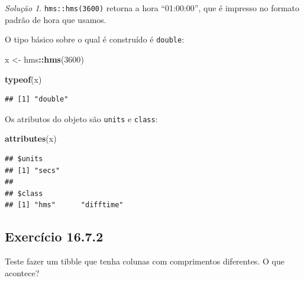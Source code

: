 \documentclass[
]{latex/krantz}
\newenvironment{Shaded}{\begin{snugshade}}{\end{snugshade}}
\newcommand{\DecValTok}[1]{\textcolor[rgb]{0.00,0.00,0.81}{#1}}
\newcommand{\FunctionTok}[1]{\textcolor[rgb]{0.13,0.29,0.53}{\textbf{#1}}}
\newcommand{\NormalTok}[1]{#1}
\newcommand{\OtherTok}[1]{\textcolor[rgb]{0.56,0.35,0.01}{#1}}
\newcommand{\SpecialCharTok}[1]{\textcolor[rgb]{0.81,0.36,0.00}{\textbf{#1}}}
\theoremstyle{definition}
\theoremstyle{definition}
\theoremstyle{definition}
\theoremstyle{definition}
\theoremstyle{remark}
\newtheorem*{solution}{Solução}
\begin{document}
\begin{solution}

\texttt{hms::hms(3600)} retorna a hora ``01:00:00'', que é impresso no formato padrão de hora que usamos.

O tipo básico sobre o qual é construído é \texttt{double}:

\begin{Shaded}
\begin{Highlighting}[]
\NormalTok{x }\OtherTok{\textless{}{-}}\NormalTok{ hms}\SpecialCharTok{::}\FunctionTok{hms}\NormalTok{(}\DecValTok{3600}\NormalTok{)}

\FunctionTok{typeof}\NormalTok{(x)}
\end{Highlighting}
\end{Shaded}

\begin{verbatim}
## [1] "double"
\end{verbatim}

Os atributos do objeto são \texttt{units} e \texttt{class}:

\begin{Shaded}
\begin{Highlighting}[]
\FunctionTok{attributes}\NormalTok{(x)}
\end{Highlighting}
\end{Shaded}

\begin{verbatim}
## $units
## [1] "secs"
## 
## $class
## [1] "hms"      "difftime"
\end{verbatim}

\end{solution}

\hypertarget{exr16-7-2}{%
\subsection*{Exercício 16.7.2}\label{exr16-7-2}}

Teste fazer um tibble que tenha colunas com comprimentos diferentes. O que acontece?
\end{document}
